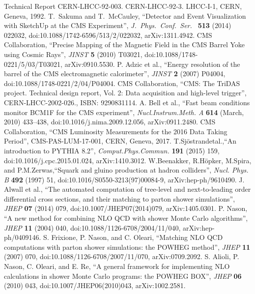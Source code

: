\begin{thebibliography}{9}
Technical Report CERN-LHCC-92-003. CERN-LHCC-92-3. LHCC-I-1, CERN, Geneva, 1992.
T.~Sakuma and T.~McCauley, ``Detector and Event Visualization with SketchUp at the CMS Experiment'', {\it J.\ Phys.\ Conf.\ Ser.\ } {\bf 513} (2014) 022032, doi:10.1088/1742-6596/513/2/022032, arXiv:1311.4942.
CMS Collaboration, ``Precise Mapping of the Magnetic Field in the CMS Barrel Yoke using Cosmic Rays'', {\it JINST} {\bf 5} (2010) T03021, doi:10.1088/1748-0221/5/03/T03021, arXiv:0910.5530.
P. Adzic et al., “Energy resolution of the barrel of the CMS electromagnetic calorimeter”,
{\it JINST} \textbf{2} (2007) P04004, doi:10.1088/1748-0221/2/04/P04004.
CMS Collaboration, ``CMS: The TriDAS project. Technical design report, Vol. 2: Data acquisition and high-level trigger'', CERN-LHCC-2002-026., ISBN: 9290831114.
A. Bell et al., “Fast beam conditions monitor BCM1F for the CMS experiment”, {\it Nucl.Instrum.Meth. A} \textbf{614} (March, 2010) 433–438, doi:10.1016/j.nima.2009.12.056, arXiv:0911.2480.
CMS Collaboration, “CMS Luminosity Measurements for the 2016 Data Taking Period”, CMS-PAS-LUM-17-001, CERN, Geneva, 2017.
T.Sj\"{o}strandetal.,“An introduction to PYTHIA 8.2”, {\it Comput.Phys.Commun.} {\bf 191} (2015) 159, doi:10.1016/j.cpc.2015.01.024, arXiv:1410.3012.
W.Beenakker, R.H\"{o}pker, M.Spira, and P.M.Zerwas,“Squark and gluino production at hadron colliders”, {\it Nucl. Phys. B} {\bf 492} (1997) 51, doi:10.1016/S0550-3213(97)00084-9, arXiv:hep-ph/9610490.
J. Alwall et al., “The automated computation of tree-level and next-to-leading order differential cross sections, and their matching to parton shower simulations”, {\it JHEP} {\bf 07} (2014) 079, doi:10.1007/JHEP07(2014)079, arXiv:1405.0301.
P. Nason, “A new method for combining NLO QCD with shower Monte Carlo algorithms”, {\it JHEP} {\bf 11} (2004) 040, doi:10.1088/1126-6708/2004/11/040, arXiv:hep-ph/0409146.
S. Frixione, P. Nason, and C. Oleari, “Matching NLO QCD computations with parton shower simulations: the POWHEG method”, {\it JHEP} {\bf 11} (2007) 070, doi:10.1088/1126-6708/2007/11/070, arXiv:0709.2092.
S. Alioli, P. Nason, C. Oleari, and E. Re, “A general framework for implementing NLO calculations in shower Monte Carlo programs: the POWHEG BOX”, {\it JHEP} {\bf 06} (2010) 043, doi:10.1007/JHEP06(2010)043, arXiv:1002.2581.

\end{thebibliography}
